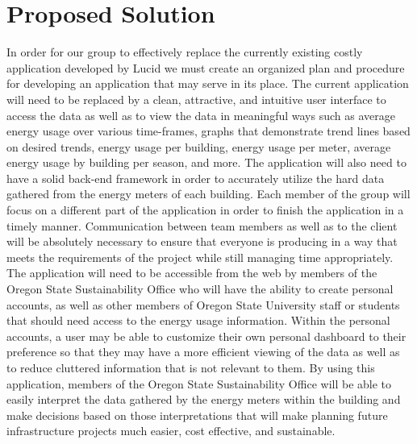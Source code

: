 \documentclass[onecolumn, draftclsnofoot,10pt, compsoc]{IEEEtran}
\begin{document}
\section{Proposed Solution}
	In order for our group to effectively replace the currently existing costly application developed by Lucid we must create an organized plan and procedure
	for developing an application that may serve in its place. The current application will need to be replaced by a clean, attractive, and intuitive user interface to access the 
	data as well as to view the data in meaningful ways such as average energy usage over various time-frames, graphs that demonstrate trend lines based on
	desired trends, energy usage per building, energy usage per meter, average energy usage by building per season, and more. The application will also need to 
	have a solid back-end framework in order to accurately utilize the hard data gathered from the energy meters of each building. Each member of the group
	will focus on a different part of the application in order to finish the application in a timely manner. Communication between team members 
	as well as to the client will be absolutely necessary to ensure that everyone is producing in a way that meets the requirements of the project while 
	still managing time appropriately. The application will need to be accessible from the web by members of the Oregon State Sustainability Office who 
	will have the ability to create personal accounts, as well as other members of Oregon State University staff or students that should need access to the
	energy usage information. Within the personal accounts, a user may be able to customize their own personal dashboard to their preference so that they
	may have a more efficient viewing of the data as well as to reduce cluttered information that is not relevant to them. By using this application, members of 
	the Oregon State Sustainability Office will be able to easily interpret the data gathered by the energy meters within the building and make decisions based on
	those interpretations that will make planning future infrastructure projects much easier, cost effective, and sustainable. 
	
\end{document}
